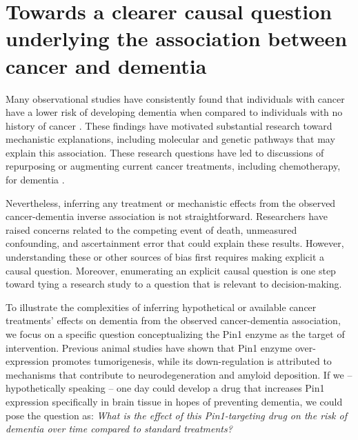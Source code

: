 \documentclass[
]{book}
\begin{document}
\newpage

\hypertarget{towards-a-clearer-causal-question-underlying-the-association-between-cancer-and-dementia}{%
\section{Towards a clearer causal question underlying the association between cancer and dementia}\label{towards-a-clearer-causal-question-underlying-the-association-between-cancer-and-dementia}}

Many observational studies have consistently found that individuals with cancer have a lower risk of developing dementia when compared to individuals with no history of cancer \autocite{ma2014,hanson2016,vanderwillik2018,ospina2020}. These findings have motivated substantial research toward mechanistic explanations, including molecular and genetic pathways that may explain this association\autocite{behrens2009,harris2014,nudelman2019,Papin2020,driverbiogeront2014,olson2019,li2021,driverpin12015}. These research questions have led to discussions of repurposing or augmenting current cancer treatments, including chemotherapy, for dementia \autocite{Snyder2017}.

Nevertheless, inferring any treatment or mechanistic effects from the observed cancer-dementia inverse association is not straightforward. Researchers have raised concerns related to the competing event of death, unmeasured confounding, and ascertainment error that could explain these results\autocite{driverbiogeront2014,ganguli2015}. However, understanding these or other sources of bias first requires making explicit a causal question. Moreover, enumerating an explicit causal question is one step toward tying a research study to a question that is relevant to decision-making\autocite{didelez2016,labrecque2017}.

To illustrate the complexities of inferring hypothetical or available cancer treatments' effects on dementia from the observed cancer-dementia association, we focus on a specific question conceptualizing the Pin1 enzyme as the target of intervention. Previous animal studies have shown that Pin1 enzyme over-expression promotes tumorigenesis, while its down-regulation is attributed to mechanisms that contribute to neurodegeneration and amyloid deposition\autocite{driverpin12015,angelucci2017,li2021}. If we -- hypothetically speaking -- one day could develop a drug that increases Pin1 expression specifically in brain tissue in hopes of preventing dementia, we could pose the question as: \emph{What is the effect of this Pin1-targeting drug on the risk of dementia over time compared to standard treatments?}
\end{document}
